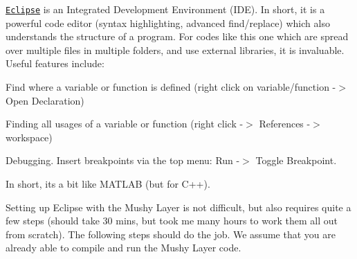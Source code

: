 \href{https://www.eclipse.org/downloads/packages/release/2018-12/r/eclipse-ide-cc-developers}{\tt Eclipse} is an Integrated Development Environment (I\+DE). In short, it is a powerful code editor (syntax highlighting, advanced find/replace) which also understands the structure of a program. For codes like this one which are spread over multiple files in multiple folders, and use external libraries, it is invaluable. Useful features include\+:


\begin{DoxyItemize}
\item Find where a variable or function is defined (right click on variable/function -\/$>$ Open Declaration)
\item Finding all usages of a variable or function (right click -\/$>$ References -\/$>$ workspace)
\item Debugging. Insert breakpoints via the top menu\+: Run -\/$>$ Toggle Breakpoint.
\end{DoxyItemize}

In short, it\textquotesingle{}s a bit like M\+A\+T\+L\+AB (but for C++).

Setting up Eclipse with the Mushy Layer is not difficult, but also requires quite a few steps (should take 30 mins, but took me many hours to work them all out from scratch). The following steps should do the job. We assume that you are already able to compile and run the Mushy Layer code.


